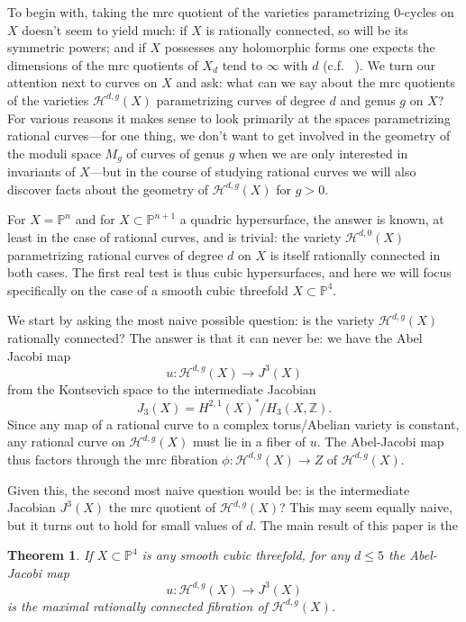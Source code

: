 \documentclass[amssymb,twoside,12 pt,amscd,reqno]{amsart}
\theoremstyle{plain}
\newtheorem{thm}{Theorem}[section]
\theoremstyle{definition}
\newcommand{\Hdg}[2]{\mathcal{H}^{#1,#2}}
\def\P{{\mathbb P}}
\def\Z{{\mathbb Z}}
\def\ps{\vspace{4pt}}
\begin{document}
To begin with, taking the mrc quotient of the varieties parametrizing
$0$-cycles on $X$ doesn't seem to yield much: if $X$ is rationally
connected, so will be its symmetric powers; and if $X$ possesses any
holomorphic forms one expects the dimensions of the mrc quotients of
$X_d$ tend  
to $\infty$ with $d$ (c.f. ~\cite{RE}).  We
turn our attention next to curves on $X$ and ask: what can we say
about the mrc quotients of the varieties $\Hdg{d}{g}(X)$ parametrizing
curves of degree $d$ and genus $g$ on $X$? For various reasons it
makes sense to look primarily at the spaces parametrizing rational
curves---for one thing, we don't want to get involved in the geometry
of the moduli space $M_g$ of curves of genus $g$ when we are only
interested in invariants of $X$---but in the course of studying
rational curves we will also discover facts about the geometry of
$\Hdg{d}{g}(X)$ for $g > 0$.

\ps

For $X = \P^n$ and for $X \subset \P^{n+1}$ a quadric hypersurface,
the answer is known, at least in the case of rational curves, and is
trivial: the variety $\Hdg{d}{0}(X)$ parametrizing rational curves of
degree $d$ on $X$ is itself rationally connected in both cases. The
first real test is thus cubic hypersurfaces, and here we will focus
specifically on the case of a smooth cubic threefold $X
\subset
\P^4$.

\ps

We start by asking the most naive possible question: is the variety
$\Hdg{d}{g}(X)$ rationally connected? The answer is that it can never
be: we have the Abel Jacobi map $$ u : \Hdg{d}{g}(X) \to J^3(X) $$
from the Kontsevich space to the intermediate Jacobian $$ J_3(X) =
H^{2,1}(X)^*/H_3(X,\Z).  $$ Since any map of a rational curve to a
complex torus/Abelian variety is constant, any rational curve on
$\Hdg{d}{g}(X)$ must lie in a fiber of $u$. The Abel-Jacobi map thus
factors through the mrc fibration $\phi : \Hdg{d}{g}(X) \to Z$ of
$\Hdg{d}{g}(X)$.

\ps

Given this, the second most naive question would be: is the
intermediate Jacobian $J^3(X)$ the mrc quotient of $\Hdg{d}{g}(X)$?
This may seem equally naive, but it turns out to hold for small values
of $d$. The main result of this paper is the

\ps

\begin{thm}\label{mainthm}  If $X \subset \P^4$ is any smooth 
cubic threefold, for any $d \leq 5$ the Abel-Jacobi
map $$ u : \Hdg{d}{g}(X) \to J^3(X) $$ is the maximal rationally
connected fibration of $\Hdg{d}{g}(X)$.
\end{thm}
\end{document}
